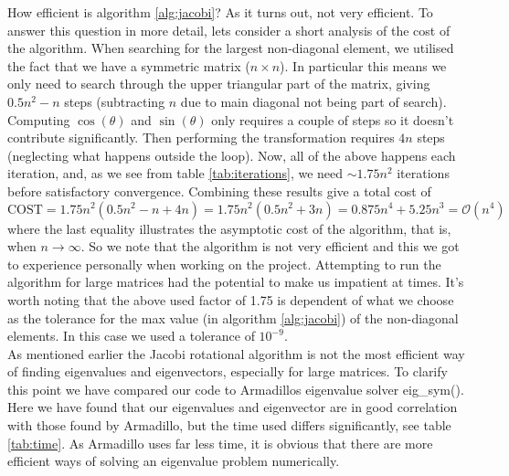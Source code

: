 \documentclass[12pt]{article}
\numberwithin{figure}{section}
\numberwithin{table}{section}
\begin{document}
\noindent How efficient is algorithm \ref{alg:jacobi}? As it turns out, not very efficient. To answer this question in more detail, lets consider a short analysis of the cost of the algorithm. When searching for the largest non-diagonal element, we utilised the fact that we have a symmetric matrix ($n\times n$). In particular this means we only need to search through the upper triangular part of the matrix, giving $0.5n^2-n$ steps (subtracting $n$ due to main diagonal not being part of search). Computing $\cos(\theta)$ and $\sin(\theta)$ only requires a couple of steps so it doesn't contribute significantly. Then performing the transformation requires $4n$ steps (neglecting what happens outside the loop). Now, all of the above happens each iteration, and, as we see from table \ref{tab:iterations}, we need $\sim 1.75n^2$ iterations before satisfactory convergence. Combining these results give a total cost of
\begin{equation}
	\text{COST}=1.75n^2(0.5n^2-n+4n)=1.75n^2(0.5n^2+3n)=0.875n^4+5.25n^3=\mathcal{O}(n^4)
\end{equation}
where the last equality illustrates the asymptotic cost of the algorithm, that is, when $n\to\infty$. So we note that the algorithm is not very efficient and this we got to experience personally when working on the project. Attempting to run the algorithm for large matrices had the potential to make us impatient at times. It's worth noting that the above used factor of 1.75 is dependent of what we choose as the tolerance for the max value (in algorithm \ref{alg:jacobi}) of the non-diagonal elements. In this case we used a tolerance of $10^{-9}$. \\

\noindent As mentioned earlier the Jacobi rotational algorithm is not the most efficient way of finding eigenvalues and eigenvectors, especially for large matrices. To clarify this point we have compared our code to Armadillos \cite{Arma} eigenvalue solver eig\_sym(). Here we have found that our eigenvalues and eigenvector are in good correlation with those found by Armadillo, but the time used differs significantly, see table \ref{tab:time}. As Armadillo uses far less time, it is obvious that there are more efficient ways of solving an eigenvalue problem numerically. \\
\end{document}
